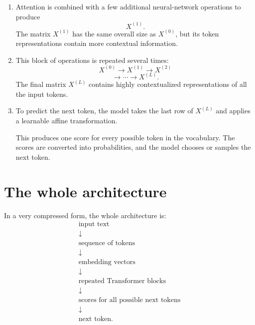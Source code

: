 \documentclass[11pt]{article}
\begin{document}
\begin{enumerate}[leftmargin=*, label=\textbf{\arabic*.}]
The attention matrix describes how much each token should use information from
the other permitted tokens.

Using \(A\) and \(V\), the model produces a new matrix \(Y\). Each row of \(Y\)
still corresponds to one token, but now incorporates information from other
tokens in the text.

\item Attention is combined with a few additional neural-network operations to
produce
\[
  X^{(1)}.
\]
The matrix \(X^{(1)}\) has the same overall size as \(X^{(0)}\), but its token
representations contain more contextual information.

\item This block of operations is repeated several times:
\[
  X^{(0)}
  \longrightarrow
  X^{(1)}
  \longrightarrow
  X^{(2)}
\]
\[
  \longrightarrow
  \cdots
  \longrightarrow
  X^{(L)}.
\]
The final matrix \(X^{(L)}\) contains highly contextualized representations of
all the input tokens.

\item To predict the next token, the model takes the last row of \(X^{(L)}\)
and applies a learnable affine transformation.

This produces one score for every possible token in the vocabulary. The scores
are converted into probabilities, and the model chooses or samples the next
token.

\end{enumerate}

\section*{The whole architecture}

In a very compressed form, the whole architecture is:
\[
\begin{array}{c}
\text{input text}
\\[0.5em]
\downarrow
\\[0.5em]
\text{sequence of tokens}
\\[0.5em]
\downarrow
\\[0.5em]
\text{embedding vectors}
\\[0.5em]
\downarrow
\\[0.5em]
\text{repeated Transformer blocks}
\\[0.5em]
\downarrow
\\[0.5em]
\text{scores for all possible next tokens}
\\[0.5em]
\downarrow
\\[0.5em]
\text{next token}.
\end{array}
\]
\end{document}

